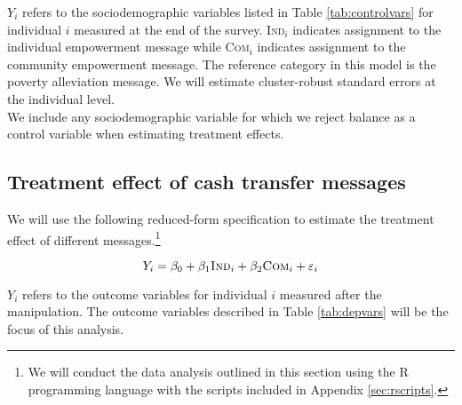 \documentclass[11pt, a4paper]{article}\usepackage[]{graphicx}\usepackage[]{color}
\begin{document}
        $Y_{i}$ refers to the sociodemographic variables listed in Table \ref{tab:controlvars} for individual $i$ measured at the end of the survey. \textsc{Ind}$_{i}$ indicates assignment to the individual empowerment message while \textsc{Com}$_{i}$ indicates assignment to the community empowerment message. The reference category in this model is the poverty alleviation message. We will estimate cluster-robust standard errors at the individual level. \\

        We include any sociodemographic variable for which we reject balance as a control variable when estimating treatment effects.

    \subsection{Treatment effect of cash transfer messages}

        We will use the following reduced-form specification to estimate the treatment effect of different messages.\footnote{We will conduct the data analysis outlined in this section using the R programming language with the scripts included in Appendix \ref{sec:rscripts}.}

  		\begin{equation} \label{eq:teffect}
            Y_{i} = \beta_{0} + \beta_{1}\text{\textsc{Ind}}_{i} + \beta_{2}\text{\textsc{Com}}_{i} + \varepsilon_{i}
		\end{equation}


        $Y_{i}$ refers to the outcome variables for individual $i$ measured after the manipulation. The outcome variables described in Table \ref{tab:depvars} will be the focus of this analysis.
        
          \begin{table}[h]
        \centering
        \caption{Primary outcome variables}
        \label{tab:depvars}
        \end{table}
\end{document}
